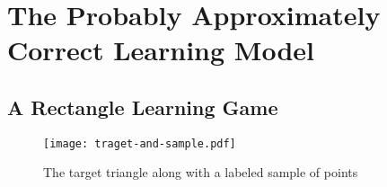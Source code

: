\chapter{The Probably Approximately Correct Learning Model}
    \section{A Rectangle Learning Game}
    \begin{figure}[h]
        \begin{center}
                \texttt{[image: traget-and-sample.pdf]}
        \end{center}
        \caption{The target triangle along with a labeled sample of points}
    \end{figure}
